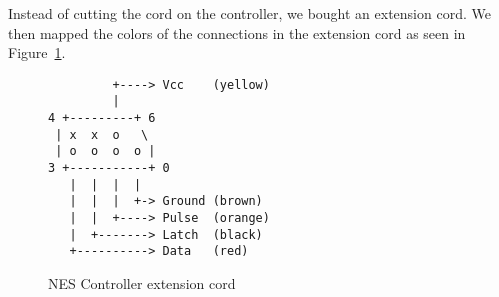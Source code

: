 Instead of cutting the cord on the controller, we bought an extension cord. We then mapped the colors of the connections in the extension cord as seen in Figure~\ref{fig:nes}.

\begin{figure}
\centering
\begin{BVerbatim}
         +----> Vcc    (yellow)
         |
4 +---------+ 6
 | x  x  o   \
 | o  o  o  o |
3 +-----------+ 0
   |  |  |  |
   |  |  |  +-> Ground (brown)
   |  |  +----> Pulse  (orange)
   |  +-------> Latch  (black)
   +----------> Data   (red)
\end{BVerbatim}
\caption{NES Controller extension cord}
\label{fig:nes}
\end{figure}




